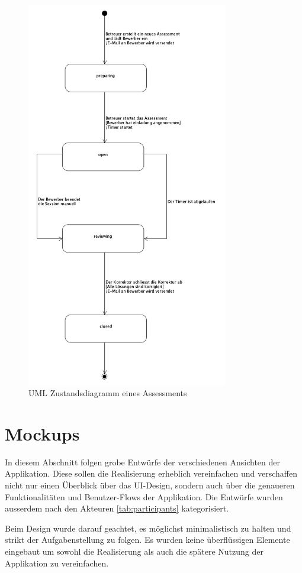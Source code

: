 \begin{figure}[H]
    \centering
    \includegraphics[height=17cm]{images/diagrams/state.png}
    \caption{\label{fig:state-diagram}UML Zustandsdiagramm eines Assessments}
\end{figure}

\newpage

\section{Mockups}

In diesem Abschnitt folgen grobe Entwürfe der verschiedenen Ansichten der Applikation. Diese sollen die Realisierung
erheblich vereinfachen und verschaffen nicht nur einen Überblick über das UI-Design, sondern auch über die genaueren
Funktionalitäten und Benutzer-Flows der Applikation. Die Entwürfe wurden ausserdem nach den Akteuren \ref{tab:participants} kategorisiert.

Beim Design wurde darauf geachtet, es möglichst minimalistisch zu halten und strikt der Aufgabenstellung zu folgen. Es wurden keine überflüssigen Elemente
eingebaut um sowohl die Realisierung als auch die spätere Nutzung der Applikation zu vereinfachen.

